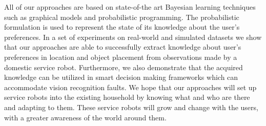 All of our approaches are based on state-of-the art Bayesian learning techniques such as graphical models and probabilistic programming. The probabilistic formulation is used to represent the state of its knowledge about the user's preferences. In a set of experiments on real-world and simulated datasets we show that our approaches are able to successfully extract knowledge about user's preferences in location and object placement from observations made by a domestic service robot. Furthermore, we also demonstrate that the acquired knowledge can be utilized in smart decision making frameworks which can accommodate vision recognition faults. We hope that our approaches will set up service robots into the existing household by knowing what and who are there and adapting to them. These service robots will grow and change with the users, with a greater awareness of the world around them.

